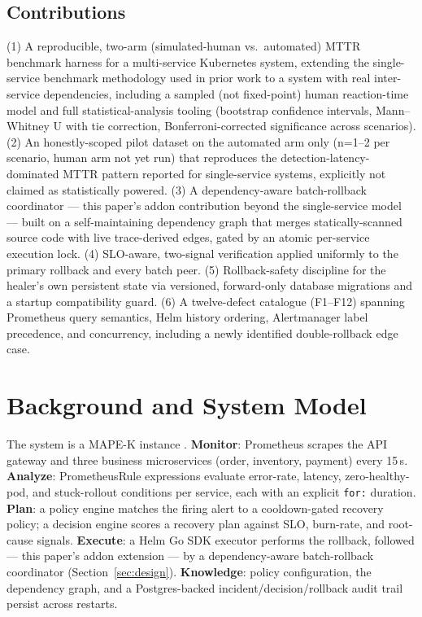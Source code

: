 \documentclass[conference]{IEEEtran}
\begin{document}
\subsection{Contributions}
(1) A reproducible, two-arm (simulated-human vs.\ automated) MTTR benchmark harness for a multi-service Kubernetes system, extending the single-service benchmark methodology used in prior work to a system with real inter-service dependencies, including a sampled (not fixed-point) human reaction-time model and full statistical-analysis tooling (bootstrap confidence intervals, Mann--Whitney U with tie correction, Bonferroni-corrected significance across scenarios). (2) An honestly-scoped pilot dataset on the automated arm only (n=1--2 per scenario, human arm not yet run) that reproduces the detection-latency-dominated MTTR pattern reported for single-service systems, explicitly not claimed as statistically powered. (3) A dependency-aware batch-rollback coordinator --- this paper's addon contribution beyond the single-service model --- built on a self-maintaining dependency graph that merges statically-scanned source code with live trace-derived edges, gated by an atomic per-service execution lock. (4) SLO-aware, two-signal verification applied uniformly to the primary rollback and every batch peer. (5) Rollback-safety discipline for the healer's own persistent state via versioned, forward-only database migrations and a startup compatibility guard. (6) A twelve-defect catalogue (F1--F12) spanning Prometheus query semantics, Helm history ordering, Alertmanager label precedence, and concurrency, including a newly identified double-rollback edge case.

\section{Background and System Model}
The system is a MAPE-K instance \cite{kephart2003vision,ibm2006blueprint}. \textbf{Monitor}: Prometheus scrapes the API gateway and three business microservices (order, inventory, payment) every 15\,s. \textbf{Analyze}: PrometheusRule expressions evaluate error-rate, latency, zero-healthy-pod, and stuck-rollout conditions per service, each with an explicit \texttt{for:} duration. \textbf{Plan}: a policy engine matches the firing alert to a cooldown-gated recovery policy; a decision engine scores a recovery plan against SLO, burn-rate, and root-cause signals. \textbf{Execute}: a Helm Go SDK executor performs the rollback, followed --- this paper's addon extension --- by a dependency-aware batch-rollback coordinator (Section~\ref{sec:design}). \textbf{Knowledge}: policy configuration, the dependency graph, and a Postgres-backed incident/decision/rollback audit trail persist across restarts.
\end{document}

